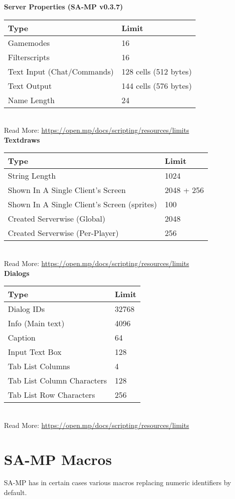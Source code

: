\documentclass{article}
\begin{document}
\newpage
\noindent\textbf{Server Properties (SA-MP v0.3.7)}
\bigskip
\\\begin{tabular}{ |l|l| } 
\hline
Type & Limit \\
\hline
Gamemodes & 16 \\
Filterscripts & 16 \\
Text Input (Chat/Commands) & 128 cells (512 bytes) \\
Text Output & 144 cells (576 bytes) \\
Name Length & 24 \\
\hline
\end{tabular}
\bigskip
\\Read More: \url{https://open.mp/docs/scripting/resources/limits}
\bigskip
\\\textbf{Textdraws}
\bigskip
\\\begin{tabular}{ |l|l| } 
\hline
Type & Limit \\
\hline
String Length & 1024 \\
Shown In A Single Client's Screen & 2048 + 256 \\
Shown In A Single Client's Screen (sprites) & 100 \\
Created Serverwise (Global) & 2048 \\
Created Serverwise (Per-Player) & 256 \\
\hline
\end{tabular}
\bigskip
\\Read More: \url{https://open.mp/docs/scripting/resources/limits}
\bigskip
\\\textbf{Dialogs}
\bigskip
\\\begin{tabular}{ |l|l| } 
\hline
Type & Limit \\
\hline
Dialog IDs & 32768 \\
Info (Main text) & 4096 \\
Caption & 64 \\
Input Text Box & 128 \\
Tab List Columns & 4 \\
Tab List Column Characters & 128 \\
Tab List Row Characters & 256 \\
\hline
\end{tabular}
\bigskip
\\Read More: \url{https://open.mp/docs/scripting/resources/limits}


\newpage
\section{SA-MP Macros}
SA-MP has in certain cases various macros replacing numeric identifiers by default.
\end{document}
